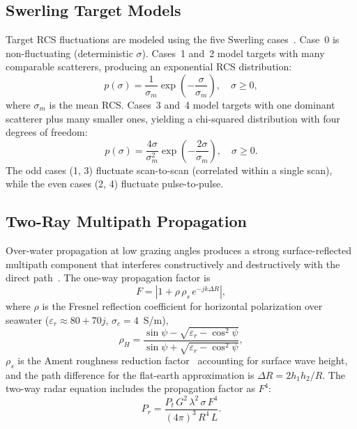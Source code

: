 \documentclass[conf]{new-aiaa}
\begin{document}
\subsection{Swerling Target Models}
Target RCS fluctuations are modeled using the five Swerling cases~\cite{Swerling1960}. Case~0 is non-fluctuating (deterministic $\sigma$). Cases~1 and~2 model targets with many comparable scatterers, producing an exponential RCS distribution:
\begin{equation}\label{eq:sw12}
p(\sigma) = \frac{1}{\sigma_m} \exp\!\left(-\frac{\sigma}{\sigma_m}\right), \quad \sigma \geq 0,
\end{equation}
where $\sigma_m$ is the mean RCS. Cases~3 and~4 model targets with one dominant scatterer plus many smaller ones, yielding a chi-squared distribution with four degrees of freedom:
\begin{equation}\label{eq:sw34}
p(\sigma) = \frac{4\sigma}{\sigma_m^2} \exp\!\left(-\frac{2\sigma}{\sigma_m}\right), \quad \sigma \geq 0.
\end{equation}
The odd cases (1, 3) fluctuate scan-to-scan (correlated within a single scan), while the even cases (2, 4) fluctuate pulse-to-pulse.

\subsection{Two-Ray Multipath Propagation}
Over-water propagation at low grazing angles produces a strong surface-reflected multipath component that interferes constructively and destructively with the direct path~\cite{Blake1980}. The one-way propagation factor is
\begin{equation}\label{eq:multipath}
F = \left|1 + \rho\,\rho_s\, e^{-jk\Delta R}\right|,
\end{equation}
where $\rho$ is the Fresnel reflection coefficient for horizontal polarization over seawater ($\varepsilon_r \approx 80 + 70j$, $\sigma_c = 4$~S/m),
\begin{equation}\label{eq:fresnel}
\rho_H = \frac{\sin\psi - \sqrt{\varepsilon_r - \cos^2\psi}}{\sin\psi + \sqrt{\varepsilon_r - \cos^2\psi}},
\end{equation}
$\rho_s$ is the Ament roughness reduction factor~\cite{Ament1953} accounting for surface wave height, and the path difference for the flat-earth approximation is $\Delta R = 2h_1 h_2 / R$. The two-way radar equation includes the propagation factor as $F^4$:
\begin{equation}\label{eq:radar_multipath}
P_r = \frac{P_t\, G^2\, \lambda^2\, \sigma\, F^4}{(4\pi)^3\, R^4\, L}.
\end{equation}
\end{document}
